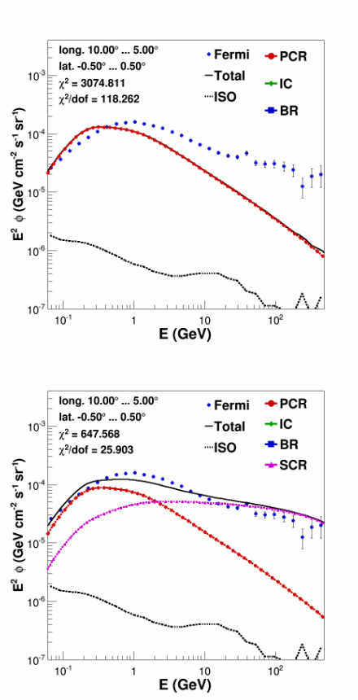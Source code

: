 \begin{figure}[h]
  \centering
  \begin{minipage}[h]{0.45\textwidth}
  	\centering
	\includegraphics[width=1.\linewidth]{pic/results/BKGonly_bubbles_Spec.png}
  	\subcaption{}
  	\label{fig:SCRonly_bubble_spec}
  \end{minipage}
  \hfill
  \begin{minipage}[h]{0.45\textwidth}
	  \centering
	  \includegraphics[width=1.\linewidth]{pic/results/SCRonly_bubbles_Spec.png}

\end{minipage}
\end{figure}
